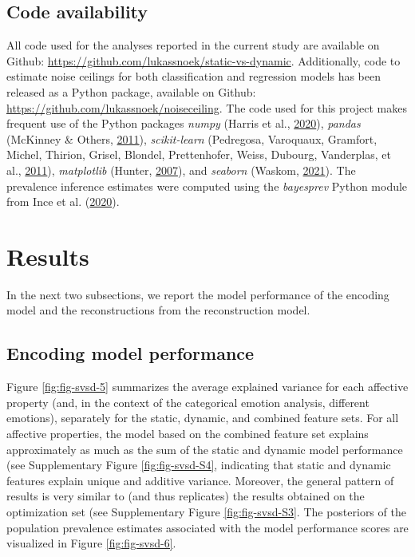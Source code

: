 \documentclass[11pt,american,]{memoir} %
\begin{document}
\hypertarget{svsd-code}{%
\subsection{Code availability}\label{svsd-code}}

All code used for the analyses reported in the current study are available on Github: \url{https://github.com/lukassnoek/static-vs-dynamic}. Additionally, code to estimate noise ceilings for both classification and regression models has been released as a Python package, available on Github: \url{https://github.com/lukassnoek/noiseceiling}. The code used for this project makes frequent use of the Python packages \emph{numpy} (Harris et al., \protect\hyperlink{ref-Harris2020-en}{2020}), \emph{pandas} (McKinney \& Others, \protect\hyperlink{ref-McKinney2011-kl}{2011}), \emph{scikit-learn} (Pedregosa, Varoquaux, Gramfort, Michel, Thirion, Grisel, Blondel, Prettenhofer, Weiss, Dubourg, Vanderplas, et al., \protect\hyperlink{ref-Pedregosa2011-bp}{2011}), \emph{matplotlib} (Hunter, \protect\hyperlink{ref-Hunter2007-at}{2007}), and \emph{seaborn} (Waskom, \protect\hyperlink{ref-waskom2021seaborn}{2021}). The prevalence inference estimates were computed using the \emph{bayesprev} Python module from Ince et al. (\protect\hyperlink{ref-Ince2020-mr}{2020}).

\hypertarget{svsd-results}{%
\section{Results}\label{svsd-results}}

In the next two subsections, we report the model performance of the encoding model and the reconstructions from the reconstruction model.

\hypertarget{encoding-model-performance}{%
\subsection{Encoding model performance}\label{encoding-model-performance}}

Figure \ref{fig:fig-svsd-5} summarizes the average explained variance for each affective property (and, in the context of the categorical emotion analysis, different emotions), separately for the static, dynamic, and combined feature sets. For all affective properties, the model based on the combined feature set explains approximately as much as the sum of the static and dynamic model performance (see Supplementary Figure \ref{fig:fig-svsd-S4}, indicating that static and dynamic features explain unique and additive variance. Moreover, the general pattern of results is very similar to (and thus replicates) the results obtained on the optimization set (see Supplementary Figure \ref{fig:fig-svsd-S3}. The posteriors of the population prevalence estimates associated with the model performance scores are visualized in Figure \ref{fig:fig-svsd-6}.
\end{document}

